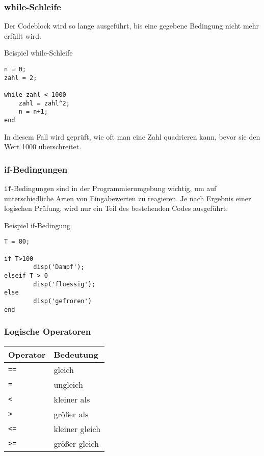         \subsubsection*{while-Schleife}
        Der Codeblock wird so lange ausgeführt, bis eine gegebene Bedingung nicht mehr erfüllt wird.
        \begin{Codelösung}{Beispiel while-Schleife}
                \begin{lstlisting}
n = 0;
zahl = 2;

while zahl < 1000
    zahl = zahl^2;
    n = n+1;
end
                \end{lstlisting}
        \end{Codelösung}
        \noindent In diesem Fall wird geprüft, wie oft man eine Zahl quadrieren kann, bevor sie den Wert 1000 überschreitet.
        \subsubsection*{if-Bedingungen}
        \texttt{if}-Bedingungen sind in der Programmierumgebung wichtig, um auf unterschiedliche Arten von Eingabewerten zu reagieren. Je nach Ergebnis einer logischen Prüfung, wird nur ein Teil des bestehenden Codes ausgeführt.
        \begin{Codelösung}{Beispiel if-Bedingung}
                \begin{lstlisting}
T = 80;

if T>100
        disp('Dampf');
elseif T > 0
        disp('fluessig');
else
        disp('gefroren')
end
                \end{lstlisting}
        \end{Codelösung}
        \subsubsection*{Logische Operatoren}
        \begin{tabularx}{\textwidth}{|X|X|}
                \hline
                \textbf{Operator} & \textbf{Bedeutung}\\
                \hline
                \texttt{==} & gleich \\
                \hline
                \texttt{\raisebox{0.5ex}{\texttildelow}=} & ungleich\\
                \hline
                \texttt{<} & kleiner als\\
                \hline
                \texttt{>} &größer als\\
                \hline
                \texttt{<=} & kleiner gleich\\
                \hline
                \texttt{>=} & größer gleich\\
                \hline
        \end{tabularx}

